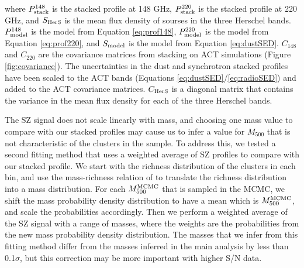 \documentclass[a4paper,fleqn,usenatbib]{mnras}
\begin{document}
where $P^{148}_{\rm stack}$ is the stacked profile at 148 GHz, $P^{220}_{\rm stack}$ is the stacked profile at 220 GHz, and $S_{\rm HerS}$ is the mean flux density of sourses in the three Herschel bands.
$P^{148}_{\rm model}$ is the model from Equation \ref{eq:prof148}, $P^{220}_{\rm model}$ is the model from Equation \ref{eq:prof220}, and $S_{\rm model}$ is the model from Equation \ref{eq:dustSED}.
$C_{148}$ and $C_{220}$ are the covariance matrices from stacking on ACT simulations (Figure \ref{fig:covariance}).
The uncertainties in the dust and synchrotron stacked profiles have been scaled to the ACT bands (Equations \ref{eq:dustSED}/\ref{eq:radioSED}) and added to the ACT covariance matrices.
$C_{\rm HerS}$ is a diagonal matrix that contains the variance in the mean flux density for each of the three Herschel bands.

The SZ signal does not scale linearly with mass, and choosing one mass value to compare with our stacked profiles may cause us to infer a value for $M_{500}$ that is not characteristic of the clusters in the sample.
To address this, we tested a second fitting method that uses a weighted average of SZ profiles to compare with our stacked profile.
We start with the richness distribution of the clusters in each bin, and use the mass-richness relation of \cite{2015MNRAS.454.2305S} to translate the richness distribution into a mass distribution. 
For each $M_{500}^{\rm MCMC}$ that is sampled in the MCMC, we shift the mass probability density distribution to have a mean which is $M_{500}^{\rm MCMC}$, and scale the probabilities accordingly. 
Then we perform a weighted average of the SZ signal with a range of masses, where the weights are the probabilities from the new mass probability density distribution.
The masses that we infer from this fitting method differ from the masses inferred in the main analysis by less than 0.1$\sigma$, but this correction may be more important with higher S/N data.
\end{document}
